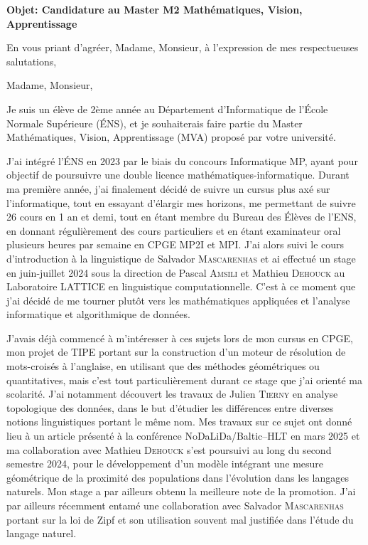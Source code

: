 \documentclass[11pt,a4paper,roman]{moderncv}
\def\nl{\\ \vspace{1em}}
\begin{document}
\date{\today}
\opening{\textbf{Objet: Candidature au Master M2 Mathématiques, Vision, Apprentissage}}
\closing{En vous priant d'agréer, Madame, Monsieur, à l'expression de mes respectueuses salutations, \vspace{-2em}}

\makelettertitle

Madame, Monsieur,
\nl

Je suis un élève de 2ème année au Département d'Informatique de l'École Normale
Supérieure (ÉNS), et je souhaiterais faire partie du Master Mathématiques,
Vision, Apprentissage (MVA) proposé par votre université.
\nl

J'ai intégré l'ÉNS en 2023 par le biais du concours Informatique MP, ayant pour
objectif de poursuivre une double licence mathématiques-informatique.
Durant ma première année, j'ai finalement décidé de suivre un cursus plus axé
sur l'informatique, tout en essayant d'élargir mes horizons, me permettant
de suivre 26 cours en 1 an et demi, tout en étant membre du Bureau
des Élèves de l'ENS, en donnant régulièrement des cours particuliers et en
étant examinateur oral plusieurs heures par semaine en CPGE MP2I et MPI.
J'ai alors suivi le cours d'introduction à la linguistique de Salvador
\textsc{Mascarenhas} et ai effectué un stage en juin-juillet 2024 sous la
direction de Pascal \textsc{Amsili} et Mathieu \textsc{Dehouck} au Laboratoire
LATTICE en linguistique computationnelle.
C'est à ce moment que j'ai décidé de me tourner plutôt vers les mathématiques
appliquées et l'analyse informatique et algorithmique de données.
\nl

J'avais déjà commencé à m'intéresser à ces sujets lors de mon cursus en CPGE,
mon projet de TIPE portant sur la construction d'un moteur de résolution de
mots-croisés à l'anglaise, en utilisant que des méthodes géométriques ou
quantitatives, mais c'est tout particulièrement durant ce stage que j'ai
orienté ma scolarité.
J'ai notamment découvert les travaux de Julien \textsc{Tierny}
en analyse topologique des données, dans le but d'étudier les différences
entre diverses notions linguistiques portant le même nom.
Mes travaux sur ce sujet ont donné lieu à un article présenté à la conférence
NoDaLiDa/Baltic--HLT en mars 2025 et ma collaboration avec Mathieu
\textsc{Dehouck} s'est poursuivi au long du second semestre 2024, pour le
développement d'un modèle intégrant une mesure géométrique de la proximité des
populations dans l'évolution dans les langages naturels.
Mon stage a par ailleurs obtenu la meilleure note de la promotion.
J'ai par ailleurs récemment entamé une collaboration avec Salvador
\textsc{Mascarenhas} portant sur la loi de Zipf et son utilisation souvent
mal justifiée dans l'étude du langage naturel.
\nl
\end{document}
